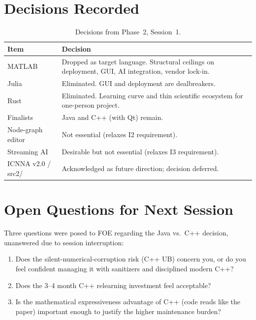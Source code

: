 \documentclass[11pt,a4paper]{article}
\begin{document}
\section{Decisions Recorded}

\begin{table}[h]
\centering
\begin{tabular}{lp{10cm}}
\toprule
\textbf{Item} & \textbf{Decision} \\
\midrule
MATLAB & Dropped as target language. Structural ceilings on deployment, GUI, AI integration, vendor lock-in. \\
Julia & Eliminated. GUI and deployment are dealbreakers. \\
Rust & Eliminated. Learning curve and thin scientific ecosystem for one-person project. \\
Finalists & Java and C++ (with Qt) remain. \\
Node-graph editor & Not essential (relaxes I2 requirement). \\
Streaming AI & Desirable but not essential (relaxes I3 requirement). \\
ICNNA v2.0 / src2/ & Acknowledged as future direction; decision deferred. \\
\bottomrule
\end{tabular}
\caption{Decisions from Phase~2, Session~1.}
\end{table}

\section{Open Questions for Next Session}

Three questions were posed to FOE regarding the Java vs.\ C++ decision, unanswered due to session interruption:

\begin{enumerate}
    \item Does the silent-numerical-corruption risk (C++ UB) concern you, or do you feel confident managing it with sanitizers and disciplined modern C++?
    \item Does the 3--4 month C++ relearning investment feel acceptable?
    \item Is the mathematical expressiveness advantage of C++ (code reads like the paper) important enough to justify the higher maintenance burden?
\end{enumerate}
\end{document}
